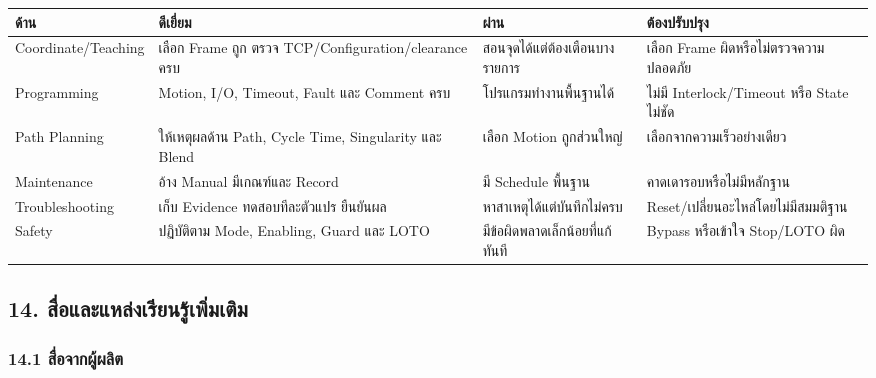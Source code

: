 \begin{table}[htbp]
    \centering
    \small
    \begin{tabularx}{\textwidth}{@{}L{0.20\textwidth}L{0.31\textwidth}L{0.22\textwidth}Y@{}}
        \hline
        \textbf{ด้าน} & \textbf{ดีเยี่ยม} & \textbf{ผ่าน} & \textbf{ต้องปรับปรุง} \\
        \hline
        Coordinate/Teaching & เลือก Frame ถูก ตรวจ TCP/Configuration/clearance ครบ & สอนจุดได้แต่ต้องเตือนบางรายการ & เลือก Frame ผิดหรือไม่ตรวจความปลอดภัย \\
        Programming & Motion, I/O, Timeout, Fault และ Comment ครบ & โปรแกรมทำงานพื้นฐานได้ & ไม่มี Interlock/Timeout หรือ State ไม่ชัด \\
        Path Planning & ให้เหตุผลด้าน Path, Cycle Time, Singularity และ Blend & เลือก Motion ถูกส่วนใหญ่ & เลือกจากความเร็วอย่างเดียว \\
        Maintenance & อ้าง Manual มีเกณฑ์และ Record & มี Schedule พื้นฐาน & คาดเดารอบหรือไม่มีหลักฐาน \\
        Troubleshooting & เก็บ Evidence ทดสอบทีละตัวแปร ยืนยันผล & หาสาเหตุได้แต่บันทึกไม่ครบ & Reset/เปลี่ยนอะไหล่โดยไม่มีสมมติฐาน \\
        Safety & ปฏิบัติตาม Mode, Enabling, Guard และ LOTO & มีข้อผิดพลาดเล็กน้อยที่แก้ทันที & Bypass หรือเข้าใจ Stop/LOTO ผิด \\
        \hline
    \end{tabularx}
\end{table}



\subsection{14. สื่อและแหล่งเรียนรู้เพิ่มเติม}

\subsubsection{14.1 สื่อจากผู้ผลิต}

